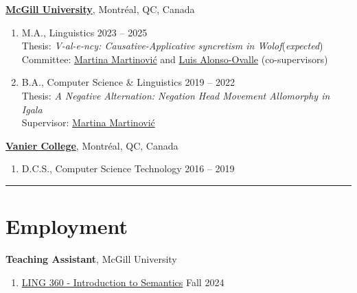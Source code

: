 \documentclass[margin,line]{resume}
\begin{document}
\begin{resume}
	\href{https://www.mcgill.ca/}{\textbf{McGill University}}, Montréal, QC, Canada
	\begin{enumerate}[-, leftmargin=1em, topsep=0.5pt]
		\item[] M.A., %
		      Linguistics%
		      \hfill 2023 -- 2025 \\
			  {\small Thesis: {\it V-al-e-ncy: Causative-Applicative syncretism in Wolof}\hfill (\textit{expected})\\
			  Committee: \href{https://inamartinovic.com/}{Martina Martinović} and \href{https://people.linguistics.mcgill.ca/~luis.alonso-ovalle/}{Luis Alonso-Ovalle} (co-supervisors)}\vspace{0.2em}
		\item[] B.A., %
		      Computer Science %
		      \& %
		      Linguistics%
		      \hfill 2019 -- 2022\\
			  {\small Thesis: {\it A Negative Alternation: Negation Head Movement Allomorphy in Igala}\\
			  Supervisor: \href{https://inamartinovic.com/}{Martina Martinović}}
	\end{enumerate}

	\href{https://www.vaniercollege.qc.ca/}{\textbf{Vanier College}}, Montréal, QC, Canada
	\begin{enumerate}[-, leftmargin=1em, topsep=0.5pt]
		\item[]  D.C.S., Computer Science Technology \hfill 2016 -- 2019
	\end{enumerate}

	\vspace{-1.2em}\rule{\textwidth}{0.4pt}





	\section{\mysidestyle Employment}

	\textbf{Teaching Assistant}, 
	McGill University
	\begin{enumerate}[-, leftmargin=1em, topsep=0.5pt]
		\item[] \href{https://www.mcgill.ca/study/2024-2025/courses/ling-360}{LING 360 - Introduction to Semantics} \hfill Fall 2024
	\end{enumerate}


\end{resume}
\end{document}
